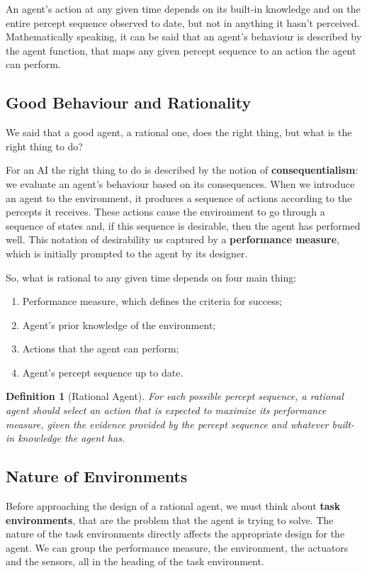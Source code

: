 \documentclass{article}
\newtheorem{definition}{Definition}
\begin{document}
An agent's action at any given time depends on its built-in knowledge and on the entire percept sequence observed to date, but not in anything it hasn't perceived. Mathematically speaking, it can be said that an agent's behaviour is described by the agent function, that maps any given percept sequence to an action the agent can perform.

\subsection{Good Behaviour and Rationality}
We said that a good agent, a rational one, does the right thing, but what is the right thing to do?

For an AI the right thing to do is described by the notion of \textbf{consequentialism}: we evaluate an agent's behaviour based on its consequences. When we introduce an agent to the environment, it produces a sequence of actions according to the percepts it receives. These actions cause the environment to go through a sequence of states and, if this sequence is desirable, then the agent has performed well. This notation of desirability us captured by a \textbf{performance measure}, which is initially prompted to the agent by its designer.

So, what is rational to any given time depends on four main thing:
\begin{enumerate}
    \item Performance measure, which defines the criteria for success;
    \item Agent's prior knowledge of the environment;
    \item Actions that the agent can perform;
    \item Agent's percept sequence up to date.
\end{enumerate}

\begin{definition}[Rational Agent]
For each possible percept sequence, a rational agent should select an action that is expected to maximize its performance measure, given the evidence provided by the percept sequence and whatever built-in knowledge the agent has.
\end{definition}

\subsection{Nature of Environments}
Before approaching the design of a rational agent, we must think about \textbf{task environments}, that are the problem that the agent is trying to solve. The nature of the task environments directly affects the appropriate design for the agent.  We can group the performance measure, the environment, the actuators and the sensors, all in the heading of the task environment.
\end{document}
